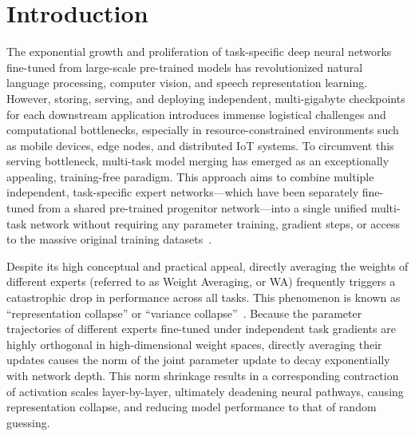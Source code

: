 \documentclass{article}
\begin{document}
\section{Introduction}
\label{sec:intro}
The exponential growth and proliferation of task-specific deep neural networks fine-tuned from large-scale pre-trained models has revolutionized natural language processing, computer vision, and speech representation learning. However, storing, serving, and deploying independent, multi-gigabyte checkpoints for each downstream application introduces immense logistical challenges and computational bottlenecks, especially in resource-constrained environments such as mobile devices, edge nodes, and distributed IoT systems. To circumvent this serving bottleneck, multi-task model merging has emerged as an exceptionally appealing, training-free paradigm. This approach aims to combine multiple independent, task-specific expert networks---which have been separately fine-tuned from a shared pre-trained progenitor network---into a single unified multi-task network without requiring any parameter training, gradient steps, or access to the massive original training datasets~\cite{wortsman2022model,ilharco2023editing,matena2022merging}.

Despite its high conceptual and practical appeal, directly averaging the weights of different experts (referred to as Weight Averaging, or WA) frequently triggers a catastrophic drop in performance across all tasks. This phenomenon is known as ``representation collapse'' or ``variance collapse''~\cite{jordan2023repair,submission10}. Because the parameter trajectories of different experts fine-tuned under independent task gradients are highly orthogonal in high-dimensional weight spaces, directly averaging their updates causes the norm of the joint parameter update to decay exponentially with network depth. This norm shrinkage results in a corresponding contraction of activation scales layer-by-layer, ultimately deadening neural pathways, causing representation collapse, and reducing model performance to that of random guessing.
\end{document}
